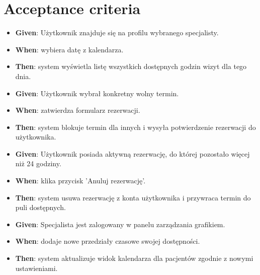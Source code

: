 \documentclass[12pt,a4paper]{article}
\begin{document}
\section{Acceptance criteria}

\begin{description}[leftmargin=1.5cm, labelwidth=1cm, labelsep=0.5cm]
\item[\textbf{AC1 -- }] 
\begin{itemize}[itemsep=2pt]
    \item \textbf{Given}: Użytkownik znajduje się na profilu wybranego specjalisty.
    \item \textbf{When}: wybiera datę z kalendarza.
    \item \textbf{Then}: system wyświetla listę wszystkich dostępnych godzin wizyt dla tego dnia.
\end{itemize}

\item[\textbf{AC2 -- }] 
\begin{itemize}[itemsep=2pt]
    \item \textbf{Given}: Użytkownik wybrał konkretny wolny termin.
    \item \textbf{When}: zatwierdza formularz rezerwacji.
    \item \textbf{Then}: system blokuje termin dla innych i wysyła potwierdzenie rezerwacji do użytkownika.
\end{itemize}

\item[\textbf{AC3 -- }] 
\begin{itemize}[itemsep=2pt]
    \item \textbf{Given}: Użytkownik posiada aktywną rezerwację, do której pozostało więcej niż 24 godziny.
    \item \textbf{When}: klika przycisk 'Anuluj rezerwację'.
    \item \textbf{Then}: system usuwa rezerwację z konta użytkownika i przywraca termin do puli dostępnych.
\end{itemize}

\item[\textbf{AC4 -- }] 
\begin{itemize}[itemsep=2pt]
    \item \textbf{Given}: Specjalista jest zalogowany w panelu zarządzania grafikiem.
    \item \textbf{When}: dodaje nowe przedziały czasowe swojej dostępności.
    \item \textbf{Then}: system aktualizuje widok kalendarza dla pacjentów zgodnie z nowymi ustawieniami.
\end{itemize}


\end{description}
\end{document}
